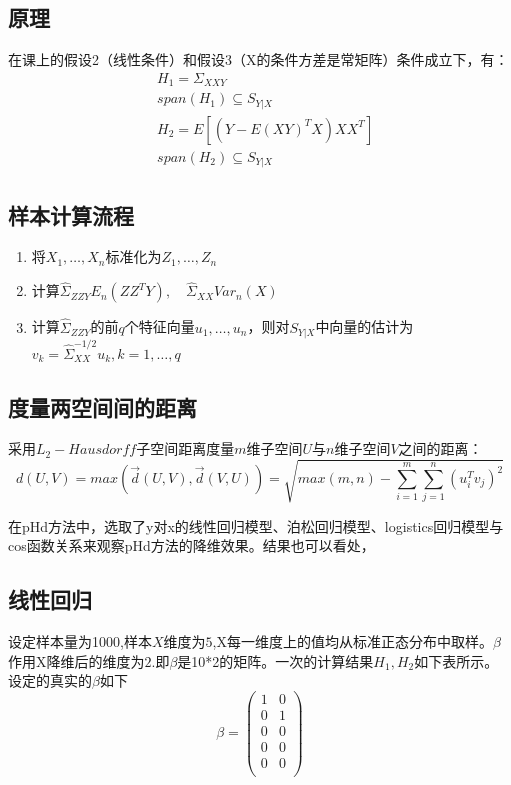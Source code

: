 \subsection{原理}
在课上的假设2（线性条件）和假设3（X的条件方差是常矩阵）条件成立下，有：
\begin{align*}
    &H_1 = \Sigma_{XXY}  \\
    &span(H_1) \subseteq S_{Y|X} \\
    &H_2 = E[(Y-E(XY)^TX)XX^T] \\
    &span(H_2) \subseteq S_{Y|X}
\end{align*}
\subsection{样本计算流程}
\begin{enumerate}
    \item 将$X_1,\dots,X_n$标准化为$Z_1,\dots,Z_n$
    \item 计算$\hat{\Sigma}_{ZZY}E_n(ZZ^TY),\quad \hat{\Sigma}_{XX}Var_n(X)$
    \item 计算$\hat{\Sigma}_{ZZY}$的前$q$个特征向量$u_1,\dots,u_n$，则对$S_{Y|X}$中向量的估计为$v_k=\hat{\Sigma}_{XX}^{-1/2}u_k,k=1,\dots,q$
\end{enumerate}

\subsection{度量两空间间的距离}
采用$L_2-Hausdorff$子空间距离度量$m$维子空间$U$与$n$维子空间$V$之间的距离：
$$d(U,V)=max(\vec{d}(U,V),\vec{d}(V,U))=\sqrt{max(m,n)-\sum_{i=1}^m\sum_{j=1}^n(u_i^Tv_j)^2}$$

在pHd方法中，选取了y对x的线性回归模型、泊松回归模型、logistics回归模型与cos函数关系来观察pHd方法的降维效果。结果也可以看处，
\subsection{线性回归}
设定样本量为1000,样本$X$维度为$5$,X每一维度上的值均从标准正态分布中取样。$\beta$作用X降维后的维度为$2$.即$\beta$是10*2的矩阵。一次的计算结果$H_1,H_2$如下表所示。设定的真实的$\beta$如下
\begin{equation}       %
   \beta= \left(                 %
      \begin{array}{cc}   %
        1 & 0 \\  %
        0 & 1 \\  %
        0 & 0 \\
        0 & 0 \\
        0 & 0 \\
      \end{array}
    \right)                 %
\end{equation}

